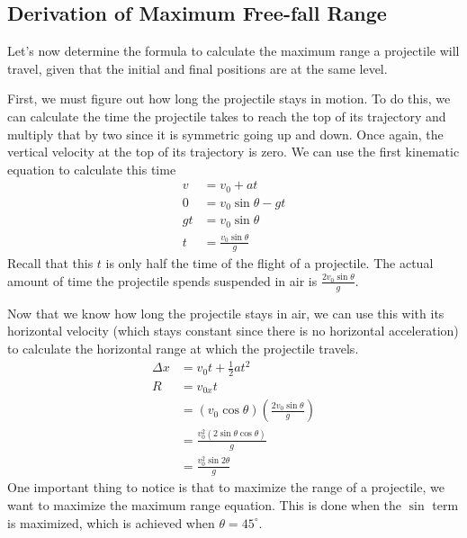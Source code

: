 \documentclass[11pt]{report}
\begin{document}
\subsection{Derivation of Maximum Free-fall Range}

Let's now determine the formula to calculate the maximum range a projectile will travel, given that the initial and final positions are at the same level. 

First, we must figure out how long the projectile stays in motion. To do this, we can calculate the time the projectile takes to reach the top of its trajectory and multiply that by two since it is symmetric going up and down. Once again, the vertical velocity at the top of its trajectory is zero. We can use the first kinematic equation to calculate this time
\begin{align*}
    v &= v_0 + at \\
    0 &= v_0\sin{\theta} - gt \\
    gt &= v_0\sin{\theta}\\
    t &= \frac{v_0\sin{\theta}}{g}
\end{align*}
Recall that this $t$ is only half the time of the flight of a projectile. The actual amount of time the projectile spends suspended in air is $\frac{2v_0\sin{\theta}}{g}$. 

Now that we know how long the projectile stays in air, we can use this with its horizontal velocity (which stays constant since there is no horizontal acceleration) to calculate the horizontal range at which the projectile travels.
\begin{align*}
    \Delta x &= v_0 t + \frac{1}{2}at^2 \\
    R &= v_{0x}t \\
      &= (v_{0}\cos{\theta})\left(\frac{2v_0\sin{\theta}}{g}\right) \\
      &= \frac{v_{0}^{2}(2\sin{\theta}\cos{\theta})}{g} \\
      &= \frac{v_{0}^{2}\sin{2\theta}}{g}
\end{align*}
One important thing to notice is that to maximize the range of a projectile, we want to maximize the maximum range equation. This is done when the $\sin$ term is maximized, which is achieved when $\theta = 45^{\circ}$. 
\end{document}
